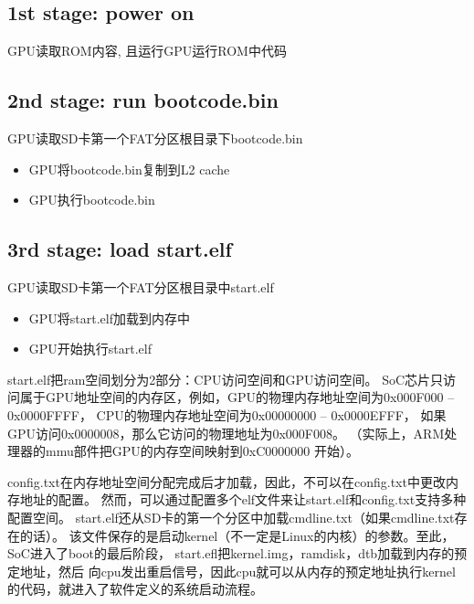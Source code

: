 \subsection{1st stage: power on}
    GPU读取ROM内容, 且运行GPU运行ROM中代码
\subsection{2nd stage: run bootcode.bin}
    GPU读取SD卡第一个FAT分区根目录下bootcode.bin
    \begin{itemize}
        \item GPU将bootcode.bin复制到L2 cache
        \item GPU执行bootcode.bin
    \end{itemize}
\subsection{3rd stage: load start.elf}
GPU读取SD卡第一个FAT分区根目录中start.elf

\begin{itemize}
    \item GPU将start.elf加载到内存中
    \item GPU开始执行start.elf
\end{itemize}
\par start.elf把ram空间划分为2部分：CPU访问空间和GPU访问空间。
SoC芯片只访问属于GPU地址空间的内存区，例如，GPU的物理内存地址空间为0x000F000 – 0x0000FFFF，
CPU的物理内存地址空间为0x00000000 – 0x0000EFFF，
如果GPU访问0x0000008，那么它访问的物理地址为0x000F008。
（实际上，ARM处理器的mmu部件把GPU的内存空间映射到0xC0000000 开始）。\par
config.txt在内存地址空间分配完成后才加载，因此，不可以在config.txt中更改内存地址的配置。
然而，可以通过配置多个elf文件来让start.elf和config.txt支持多种配置空间。
start.elf还从SD卡的第一个分区中加载cmdline.txt（如果cmdline.txt存在的话）。
该文件保存的是启动kernel（不一定是Linux的内核）的参数。至此，SoC进入了boot的最后阶段，
start.efl把kernel.img，ramdisk，dtb加载到内存的预定地址，然后
向cpu发出重启信号，因此cpu就可以从内存的预定地址执行kernel的代码，就进入了软件定义的系统启动流程。
